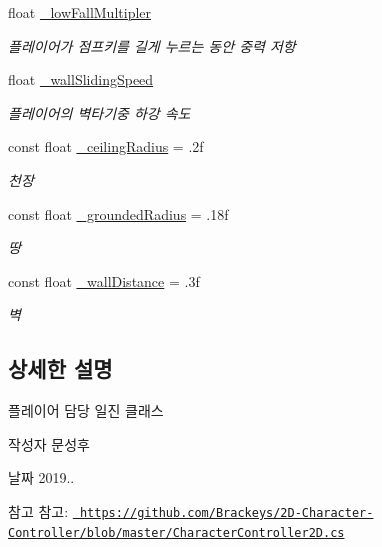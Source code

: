 \begin{DoxyCompactItemize}
float \mbox{\hyperlink{class_player_controller_a22c8d9bc37fc9e2e9adb147bdf8867ef}{\+\_\+low\+Fall\+Multipler}}
\begin{DoxyCompactList}\small\item\em 플레이어가 점프키를 길게 누르는 동안 중력 저항 \end{DoxyCompactList}\item 
float \mbox{\hyperlink{class_player_controller_a20e9c123deaac078932a4def658c20bb}{\+\_\+wall\+Sliding\+Speed}}
\begin{DoxyCompactList}\small\item\em 플레이어의 벽타기중 하강 속도 \end{DoxyCompactList}\item 
const float \mbox{\hyperlink{class_player_controller_a899075705a92c6e4831dc3276dcaebcf}{\+\_\+ceiling\+Radius}} = .\+2f
\begin{DoxyCompactList}\small\item\em 천장 \end{DoxyCompactList}\item 
const float \mbox{\hyperlink{class_player_controller_a81d04f96edabfd06d6ba1ecb26322f6a}{\+\_\+grounded\+Radius}} = .\+18f
\begin{DoxyCompactList}\small\item\em 땅 \end{DoxyCompactList}\item 
const float \mbox{\hyperlink{class_player_controller_a07f0db2435a8eaeb68c30347135a7a17}{\+\_\+wall\+Distance}} = .\+3f
\begin{DoxyCompactList}\small\item\em 벽 \end{DoxyCompactList}\end{DoxyCompactItemize}


\subsection{상세한 설명}
플레이어 담당 일진 클래스 

\begin{DoxyAuthor}{작성자}
문성후 
\end{DoxyAuthor}
\begin{DoxyDate}{날짜}
2019.. 
\end{DoxyDate}
\begin{DoxySeeAlso}{참고}
참고\+: \href{https://github.com/Brackeys/2D-Character-Controller/blob/master/CharacterController2D.cs}{\texttt{ https\+://github.\+com/\+Brackeys/2\+D-\/\+Character-\/\+Controller/blob/master/\+Character\+Controller2\+D.\+cs}} 
\end{DoxySeeAlso}


